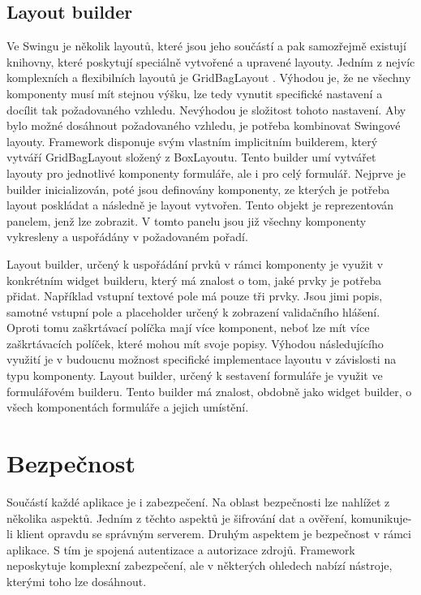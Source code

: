 \subsection{Layout builder}
Ve Swingu je několik layoutů, které jsou jeho součástí a pak samozřejmě existují knihovny, které poskytují speciálně vytvořené a upravené layouty. Jedním z nejvíc komplexních a flexibilních layoutů je GridBagLayout \cite{gridBagLayout}. Výhodou je, že ne všechny komponenty musí mít stejnou výšku, lze tedy vynutit specifické nastavení a docílit tak požadovaného vzhledu. Nevýhodou je složitost tohoto nastavení. Aby bylo možné dosáhnout požadovaného vzhledu, je potřeba kombinovat Swingové layouty. Framework disponuje svým vlastním implicitním builderem, který vytváří GridBagLayout složený z BoxLayoutu. Tento builder umí vytvářet layouty pro jednotlivé komponenty formuláře, ale i pro celý formulář. Nejprve je builder inicializován, poté jsou definovány komponenty, ze kterých je potřeba layout poskládat a následně je layout vytvořen. Tento objekt je reprezentován panelem, jenž lze zobrazit. V tomto panelu jsou již všechny komponenty vykresleny a uspořádány v požadovaném pořadí. 

Layout builder, určený k uspořádání prvků v rámci komponenty je využit v konkrétním widget builderu, který má znalost o tom, jaké prvky je potřeba přidat. Například vstupní textové pole má pouze tři prvky. Jsou jimi popis, samotné vstupní pole a placeholder určený k zobrazení validačního hlášení. Oproti tomu zaškrtávací políčka mají více komponent, neboť lze mít více zaškrtávacích políček, které mohou mít svoje popisy. Výhodou následujícího využití je v budoucnu možnost specifické implementace layoutu v závislosti na typu komponenty. Layout builder, určený k sestavení formuláře je využit ve formulářovém builderu. Tento builder má znalost, obdobně jako widget builder, o všech komponentách formuláře a jejich umístění. 

\section{Bezpečnost}
Součástí každé aplikace je i zabezpečení. Na oblast bezpečnosti lze nahlížet z několika aspektů. Jedním z těchto aspektů je šifrování dat a ověření, komunikuje-li klient opravdu se správným serverem. Druhým aspektem je bezpečnost v rámci aplikace. S tím je spojená autentizace a autorizace zdrojů. Framework neposkytuje komplexní zabezpečení, ale v některých ohledech nabízí nástroje, kterými toho lze dosáhnout.

